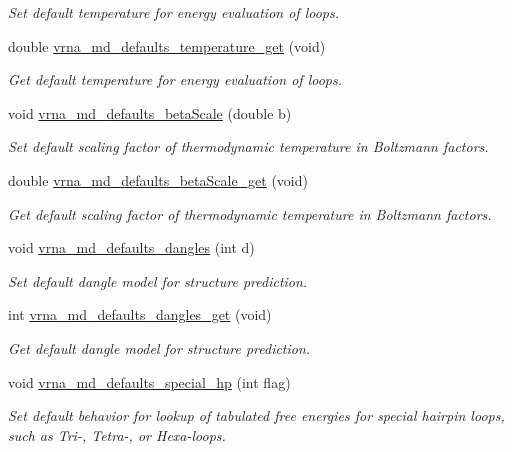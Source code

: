 \begin{DoxyCompactItemize}
\begin{DoxyCompactList}\small\item\em Set default temperature for energy evaluation of loops. \end{DoxyCompactList}\item 
double \hyperlink{group__model__details_ga96b24a74437f9ba46c4e06343155bf46}{vrna\-\_\-md\-\_\-defaults\-\_\-temperature\-\_\-get} (void)
\begin{DoxyCompactList}\small\item\em Get default temperature for energy evaluation of loops. \end{DoxyCompactList}\item 
void \hyperlink{group__model__details_gae984567db36c3f9b8731ecc917abf3a2}{vrna\-\_\-md\-\_\-defaults\-\_\-beta\-Scale} (double b)
\begin{DoxyCompactList}\small\item\em Set default scaling factor of thermodynamic temperature in Boltzmann factors. \end{DoxyCompactList}\item 
double \hyperlink{group__model__details_gabb8780f5410c52f970d75b044059bd09}{vrna\-\_\-md\-\_\-defaults\-\_\-beta\-Scale\-\_\-get} (void)
\begin{DoxyCompactList}\small\item\em Get default scaling factor of thermodynamic temperature in Boltzmann factors. \end{DoxyCompactList}\item 
void \hyperlink{group__model__details_gac76a5374def8e5e4e644ff6e4cc72dee}{vrna\-\_\-md\-\_\-defaults\-\_\-dangles} (int d)
\begin{DoxyCompactList}\small\item\em Set default dangle model for structure prediction. \end{DoxyCompactList}\item 
int \hyperlink{group__model__details_ga67ca06f95ae133778c79a4493c9817b8}{vrna\-\_\-md\-\_\-defaults\-\_\-dangles\-\_\-get} (void)
\begin{DoxyCompactList}\small\item\em Get default dangle model for structure prediction. \end{DoxyCompactList}\item 
void \hyperlink{group__model__details_gafff6449a02744add0308e653230c15fc}{vrna\-\_\-md\-\_\-defaults\-\_\-special\-\_\-hp} (int flag)
\begin{DoxyCompactList}\small\item\em Set default behavior for lookup of tabulated free energies for special hairpin loops, such as Tri-\/, Tetra-\/, or Hexa-\/loops. \end{DoxyCompactList}\item 

\end{DoxyCompactItemize}
